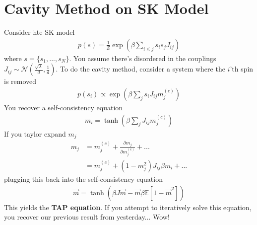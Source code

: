 \section{Cavity Method on SK Model}
Consider hte SK model
\begin{align}
	p(s) = \frac{1}{Z} \exp \left(\beta \sum_{i\leq j} s_i s_j J_{ij} \right)
\end{align}
where $s = \{s_1, ..., s_N\}$. You assume there's disordered in the couplings $J_{ij} \sim \mathcal N(\frac{\sqrt{\lambda}}{d}, \frac{1}{d})$. To do the cavity method, consider a system where the $i$'th spin is removed
\begin{align}
	p(s_i) \propto \exp(\beta \sum_j s_i J_{ij} m^{(c)}_j)
\end{align}
You recover a self-consistency equation 
\begin{align}
	m_i = \tanh (\beta \sum_j J_{ij} m_j^{(c)})
\end{align}
If you taylor expand $m_j$
\begin{align}
	m_j & = m_j^{(c)} + \frac{\partial m_j}{\partial m_j^{(c)}} + ...\\
	& = m_j^{(c)} + (1 - m^2_j) J_{ij} \beta m_i + ...
\end{align}
plugging this back into the self-consistency equation
\begin{align}
	\vec m = \tanh (\beta J \vec m - \vec m \beta \mathbb E[1 - \vec m^2])
\end{align}
This yields the \textbf{TAP equation}. If you attempt to iteratively solve this equation, you recover our previous result from yesterday... Wow!

